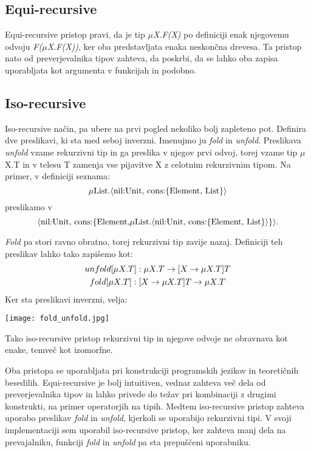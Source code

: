 \documentclass[12pt,a4paper,openany]{book}
\begin{document}
\subsection{Equi-recursive}
Equi-recursive pristop pravi, da je tip \emph{\(\mu\)X.F(X)} po definiciji enak njegovemu odvoju \emph{F(\(\mu\)X.F(X))}, ker oba predstavljata enaka neskončna drevesa. Ta pristop nato od 
preverjevalnika tipov zahteva, da poskrbi, da se lahko oba zapisa uporabljata kot argumenta v funkcijah in podobno.

\subsection{Iso-recursive}
Iso-recursive način, pa ubere na prvi pogled nekoliko bolj zapleteno pot. Definira dve preslikavi, ki sta med seboj inverzni. Imenujmo ju \emph{fold} in \emph{unfold}. Preslikava 
\emph{unfold} vzame rekurzivni tip in ga preslika v njegov prvi odvoj, torej vzame tip \(\mu\)X.T in v telesu T zamenja vse pijavitve X z celotnim rekurzivnim tipom. Na primer, v definiciji 
seznama: 
\begin{equation}
    \mu \text{List.}\langle\text{nil:Unit, cons:}\{\text{Element, List}\}\rangle \notag
\end{equation}
preslikamo v
\begin{equation}
    \langle\text{nil:Unit, cons:}\{\text{Element,} \mu \text{List.}\langle\text{nil:Unit, cons:}\{\text{Element, List}\}\rangle\}\rangle. \notag
\end{equation}
  
\emph{Fold} pa stori ravno obratno, torej rekurzivni tip zavije nazaj. Definiciji teh preslikav lahko tako zapišemo kot:
\begin{gather}
    unfold[\mu X.T]: \mu X.T \rightarrow [X \rightarrow \mu X.T] T \notag\\
    fold[\mu X.T]: [X \rightarrow \mu X.T] T \rightarrow \mu X.T \notag
\end{gather}
Ker sta preslikavi inverzni, velja:

\begin{center}
\texttt{[image: fold\_unfold.jpg]}
\end{center}

Tako iso-recursive pristop rekurzivni tip in njegove odvoje ne obravnava kot enake, temveč kot izomorfne.

Oba pristopa se uporabljata pri konstrukciji programskih jezikov in teoretičnih besedilih. Equi-recursive je bolj intuitiven, vednar zahteva več dela od preverjevalnika tipov in 
lahko privede do težav pri kombinaciji z drugimi konstrukti, na primer operatorjih na tipih. Medtem iso-recursive pristop zahteva uporabo preslikav \emph{fold} in \emph{unfold}, kjerkoli 
se uporabijo rekurzivni tipi. V svoji implementaciji sem uporabil iso-recursive pristop, ker zahteva manj dela na prevajalniku, funkciji \emph{fold} in \emph{unfold} pa sta prepuščeni uporabniku.
\end{document}
